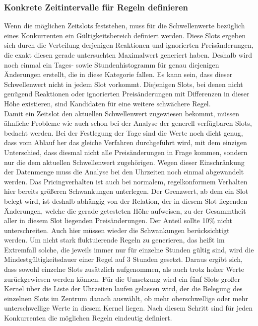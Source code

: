 \subsubsection{Konkrete Zeitintervalle für Regeln definieren}
Wenn die möglichen Zeitslots feststehen, muss für die Schwellenwerte bezüglich eines Konkurrenten ein Gültigkeitsbereich definiert werden. Diese Slots ergeben sich durch die Verteilung derjenigen Reaktionen und ignorierten Preisänderungen, die exakt diesen gerade untersuchten Maximalwert generiert haben. Deshalb wird noch einmal ein Tages- sowie Stundenhistogramm für genau diejenigen Änderungen erstellt, die in diese Kategorie fallen. Es kann sein, dass dieser Schwellenwert nicht in jedem Slot vorkommt. Diejenigen Slots, bei denen nicht genügend Reaktionen oder ignorierten Preisänderungen mit Differenzen in dieser Höhe existieren, sind Kandidaten für eine weitere schwächere Regel.\\
Damit ein Zeitslot den aktuellen Schwellenwert zugewiesen bekommt, müssen ähnliche Probleme wie auch schon bei der Analyse der generell verfügbaren Slots, bedacht werden. Bei der Festlegung der Tage sind die Werte noch dicht genug, dass vom Ablauf her das gleiche Verfahren durchgeführt wird, mit dem einzigen Unterschied, dass diesmal nicht alle Preisänderungen in Frage kommen, sondern nur die dem aktuellen Schwellenwert zugehörigen. Wegen dieser Einschränkung der Datenmenge muss die Analyse bei den Uhrzeiten noch einmal abgewandelt werden. Das Pricingverhalten ist auch bei normalem, regelkonformem Verhalten hier bereits größeren Schwankungen unterlegen. Der Grenzwert, ab dem ein Slot belegt wird, ist deshalb abhängig von der Relation, der in diesem Slot liegenden Änderungen, welche die gerade getesteten Höhe aufweisen, zu der Gesammtheit aller in diesem Slot liegenden Preisänderungen. Der Anteil sollte 10\% nicht unterschreiten. Auch hier müssen wieder die Schwankungen berücksichtigt werden. Um nicht stark fluktuierende Regeln zu generieren, das heißt im Extremfall solche, die jeweils immer nur für einzelne Stunden gültig sind, wird die Mindestgültigkeitsdauer einer Regel auf 3 Stunden gesetzt. Daraus ergibt sich, dass sowohl einzelne Slots zusätzlich aufgenommen, als auch trotz hoher Werte zurückgewiesen werden können. Für die Umsetzung wird ein fünf Slots großer Kernel über die Liste der Uhrzeiten laufen gelassen wird, der die Belegung des einzelnen Slots im Zentrum danach auswählt, ob mehr oberschwellige oder mehr unterschwellige Werte in diesem Kernel liegen. Nach diesem Schritt sind für jeden Konkurrenten die möglichen Regeln eindeutig definiert.

